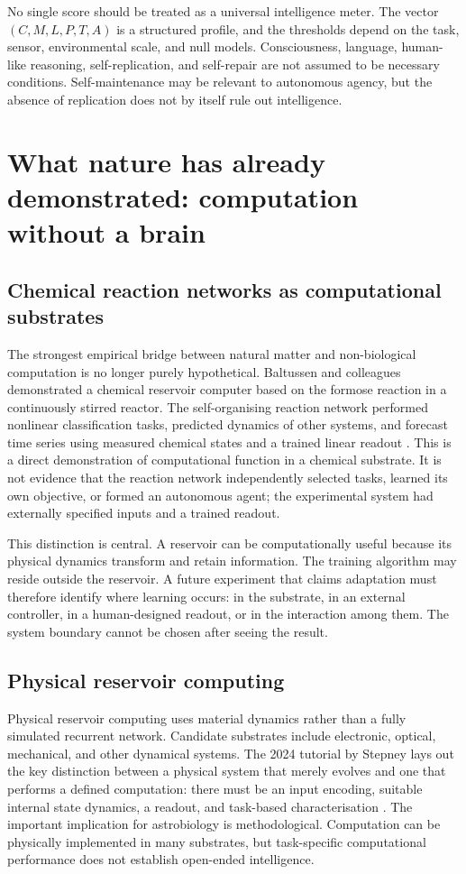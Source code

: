 \documentclass[11pt]{article}
\begin{document}
No single score should be treated as a universal intelligence meter. The vector $(C,M,L,P,T,A)$ is a structured profile, and the thresholds depend on the task, sensor, environmental scale, and null models. Consciousness, language, human-like reasoning, self-replication, and self-repair are not assumed to be necessary conditions. Self-maintenance may be relevant to autonomous agency, but the absence of replication does not by itself rule out intelligence.

\section{What nature has already demonstrated: computation without a brain}

\subsection{Chemical reaction networks as computational substrates}

The strongest empirical bridge between natural matter and non-biological computation is no longer purely hypothetical. Baltussen and colleagues demonstrated a chemical reservoir computer based on the formose reaction in a continuously stirred reactor. The self-organising reaction network performed nonlinear classification tasks, predicted dynamics of other systems, and forecast time series using measured chemical states and a trained linear readout \citep{Baltussen2024}. This is a direct demonstration of computational function in a chemical substrate. It is not evidence that the reaction network independently selected tasks, learned its own objective, or formed an autonomous agent; the experimental system had externally specified inputs and a trained readout.

This distinction is central. A reservoir can be computationally useful because its physical dynamics transform and retain information. The training algorithm may reside outside the reservoir. A future experiment that claims adaptation must therefore identify where learning occurs: in the substrate, in an external controller, in a human-designed readout, or in the interaction among them. The system boundary cannot be chosen after seeing the result.

\subsection{Physical reservoir computing}

Physical reservoir computing uses material dynamics rather than a fully simulated recurrent network. Candidate substrates include electronic, optical, mechanical, and other dynamical systems. The 2024 tutorial by Stepney lays out the key distinction between a physical system that merely evolves and one that performs a defined computation: there must be an input encoding, suitable internal state dynamics, a readout, and task-based characterisation \citep{Stepney2024}. The important implication for astrobiology is methodological. Computation can be physically implemented in many substrates, but task-specific computational performance does not establish open-ended intelligence.
\end{document}
